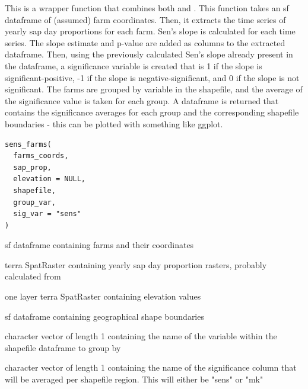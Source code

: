 %
\begin{Description}
This is a wrapper function that combines both  and
. This function takes an sf dataframe of (assumed) farm
coordinates. Then, it extracts the time series of yearly sap day
proportions for each farm. Sen's slope is calculated for each time series.
The slope estimate and p-value are added as columns to the extracted
dataframe. Then, using the previously calculated
Sen's slope already present in the dataframe, a significance variable is
created that is 1 if the slope is significant-positive, -1 if the slope is
negative-significant, and 0 if the slope is not significant.
The farms are grouped by variable in the shapefile, and the average of the
significance value is taken for each group. A dataframe is returned that
contains the significance averages for each group and the corresponding
shapefile boundaries - this can be plotted with something like ggplot.
\end{Description}
%
\begin{Usage}
\begin{verbatim}
sens_farms(
  farms_coords,
  sap_prop,
  elevation = NULL,
  shapefile,
  group_var,
  sig_var = "sens"
)
\end{verbatim}
\end{Usage}
%
\begin{Arguments}
\begin{ldescription}
\item[\code{farms\_coords}] sf dataframe containing farms and their coordinates

\item[\code{sap\_prop}] terra SpatRaster containing yearly sap day proportion
rasters, probably calculated from 

\item[\code{elevation}] one layer terra SpatRaster containing elevation values

\item[\code{shapefile}] sf dataframe containing geographical shape boundaries

\item[\code{group\_var}] character vector of length 1 containing the name of the
variable within the shapefile dataframe to group by

\item[\code{sig\_var}] character vector of length 1 containing the name of the
significance column that will be averaged per shapefile region. This will
either be "sens" or "mk"
\end{ldescription}
\end{Arguments}

